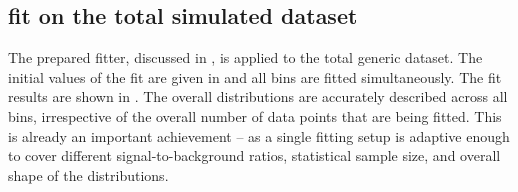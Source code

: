 \subsection{\texorpdfstring{\Mbc}{Mbc} fit on the total simulated dataset}\label{sec:mbc_fit_full_mc}

The prepared fitter, discussed in , is applied to the total generic \MC dataset.
The initial values of the fit are given in  and all bins are fitted simultaneously.
The fit results are shown in .
The overall \Mbc distributions are accurately described across all \EB bins, irrespective of the overall number of data points that are being fitted.
This is already an important achievement -- as a single fitting setup is adaptive enough to cover different signal-to-background ratios, statistical sample size, and overall shape of the distributions.

